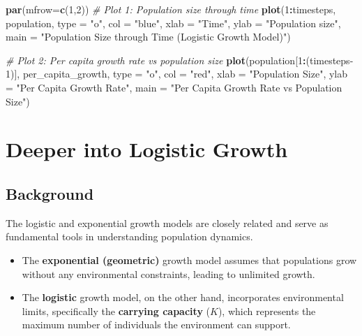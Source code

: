 \documentclass[
  a4paper]{book}
\newenvironment{Shaded}{\begin{snugshade}}{\end{snugshade}}
\newcommand{\AttributeTok}[1]{\textcolor[rgb]{0.13,0.29,0.53}{#1}}
\newcommand{\CommentTok}[1]{\textcolor[rgb]{0.56,0.35,0.01}{\textit{#1}}}
\newcommand{\DecValTok}[1]{\textcolor[rgb]{0.00,0.00,0.81}{#1}}
\newcommand{\FunctionTok}[1]{\textcolor[rgb]{0.13,0.29,0.53}{\textbf{#1}}}
\newcommand{\NormalTok}[1]{#1}
\newcommand{\SpecialCharTok}[1]{\textcolor[rgb]{0.81,0.36,0.00}{\textbf{#1}}}
\newcommand{\StringTok}[1]{\textcolor[rgb]{0.31,0.60,0.02}{#1}}
\providecommand{\tightlist}{%
  \setlength{\itemsep}{0pt}\setlength{\parskip}{0pt}}
\begin{document}
\begin{Shaded}
\begin{Highlighting}[]
\FunctionTok{par}\NormalTok{(}\AttributeTok{mfrow=}\FunctionTok{c}\NormalTok{(}\DecValTok{1}\NormalTok{,}\DecValTok{2}\NormalTok{))}
\CommentTok{\# Plot 1: Population size through time}
\FunctionTok{plot}\NormalTok{(}\DecValTok{1}\SpecialCharTok{:}\NormalTok{timesteps, population, }\AttributeTok{type =} \StringTok{"o"}\NormalTok{, }\AttributeTok{col =} \StringTok{"blue"}\NormalTok{, }
     \AttributeTok{xlab =} \StringTok{"Time"}\NormalTok{, }\AttributeTok{ylab =} \StringTok{"Population size"}\NormalTok{,}
     \AttributeTok{main =} \StringTok{"Population Size through Time (Logistic Growth Model)"}\NormalTok{)}

\CommentTok{\# Plot 2: Per capita growth rate vs population size}
\FunctionTok{plot}\NormalTok{(population[}\DecValTok{1}\SpecialCharTok{:}\NormalTok{(timesteps}\DecValTok{{-}1}\NormalTok{)], per\_capita\_growth, }
     \AttributeTok{type =} \StringTok{"o"}\NormalTok{, }\AttributeTok{col =} \StringTok{"red"}\NormalTok{, }
     \AttributeTok{xlab =} \StringTok{"Population Size"}\NormalTok{, }
     \AttributeTok{ylab =} \StringTok{"Per Capita Growth Rate"}\NormalTok{,}
     \AttributeTok{main =} \StringTok{"Per Capita Growth Rate vs Population Size"}\NormalTok{)}
\end{Highlighting}
\end{Shaded}

\chapter{Deeper into Logistic Growth}\label{deeper-into-logistic-growth}

\section{Background}\label{background-6}

The logistic and exponential growth models are closely related and serve as fundamental tools in understanding population dynamics.

\begin{itemize}
\tightlist
\item
  The \textbf{exponential (geometric)} growth model assumes that populations grow without any environmental constraints, leading to unlimited growth.
\item
  The \textbf{logistic} growth model, on the other hand, incorporates environmental limits, specifically the \textbf{carrying capacity} (\(K\)), which represents the maximum number of individuals the environment can support.
\end{itemize}
\end{document}
